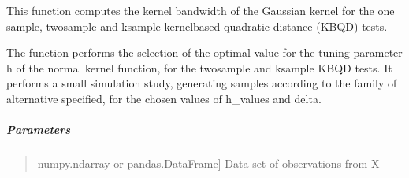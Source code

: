 \documentclass[letterpaper,10pt,english,openany,oneside]{sphinxmanual}
\begin{document}
\begin{fulllineitems}
\label{\detokenize{api_reference/generated/QuadratiK.kernel_test.select_h:QuadratiK.kernel_test.select_h}}
\pysigstartsignatures
{}
\pysigstopsignatures
\sphinxAtStartPar
This function computes the kernel bandwidth of the Gaussian kernel 
for the one sample, two\sphinxhyphen{}sample and k\sphinxhyphen{}sample kernel\sphinxhyphen{}based quadratic 
distance (KBQD) tests.

\sphinxAtStartPar
The function performs the selection of the optimal value for the tuning 
parameter h of the normal kernel function, for the two\sphinxhyphen{}sample and k\sphinxhyphen{}sample 
KBQD tests. It performs a small simulation study, generating samples according 
to the family of alternative specified, for the chosen values
of h\_values and delta.


\subparagraph{Parameters}
\label{\detokenize{api_reference/generated/QuadratiK.kernel_test.select_h:parameters}}\begin{quote}
\begin{description}
\sphinxlineitem{x}{[}numpy.ndarray or pandas.DataFrame{]}
\sphinxAtStartPar
Data set of observations from X


\end{description}
\end{quote}
\end{fulllineitems}
\end{document}
